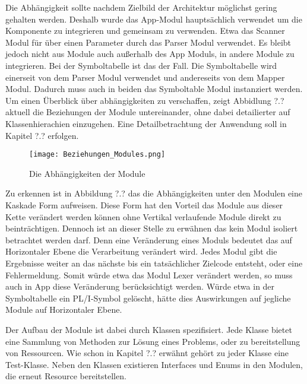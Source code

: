 Die Abhängigkeit sollte nachdem Zielbild der Architektur möglichst gering gehalten werden.
Deshalb wurde das App-Modul hauptsächlich verwendet um die Komponente zu integrieren und gemeinsam zu verwenden.
Etwa das Scanner Modul für über einen Parameter durch das Parser Modul verwendet.
Es bleibt jedoch nicht aus Module auch außerhalb des App Moduls, in andere Module zu integrieren.
Bei der Symboltabelle ist das der Fall. Die Symboltabelle wird einerseit von dem Parser Modul verwendet und andereseits von dem Mapper Modul.
Dadurch muss auch in beiden das Symboltable Modul instanziert werden. Um einen Überblick über abhängigkeiten zu verschaffen, zeigt
Abbidlung ?.? aktuell die Beziehungen der Module untereinander, ohne dabei detailierter auf Klassenhierachien einzugehen. 
Eine Detailbetrachtung der Anwendung soll in Kapitel ?.? erfolgen.

\begin{figure}[h]
	\centering
	\caption{Die Abhängigkeiten der Module}
	\texttt{[image: Beziehungen\_Modules.png]}
	\label{fig:modules}
\end{figure}

Zu erkennen ist in Abbildung ?.? das die Abhängigkeiten unter den Modulen eine Kaskade Form aufweisen.
Diese Form hat den Vorteil das Module aus dieser Kette verändert werden können ohne Vertikal verlaufende Module direkt zu beinträchtigen.
Dennoch ist an dieser Stelle zu erwähnen das kein Modul isoliert betrachtet werden darf. Denn eine Veränderung eines Moduls bedeutet das auf Horizontaler 
Ebene die Verarbeitung verändert wird.
Jedes Modul gibt die Ergebnisse weiter an das nächste bis ein tatsächlicher Zielcode entsteht, oder eine Fehlermeldung.
Somit würde etwa das Modul Lexer verändert werden, so muss auch in App diese Veränderung berücksichtigt werden.
Würde etwa in der Symboltabelle ein PL/I-Symbol gelöscht, hätte dies Auswirkungen auf jegliche Module auf Horizontaler Ebene. 

Der Aufbau der Module ist dabei durch Klassen spezifisiert. Jede Klasse bietet eine Sammlung von Methoden zur Lösung eines Problems,
oder zu bereitstellung von Ressourcen. 
Wie schon in Kapitel ?.? erwähnt gehört zu jeder Klasse eine Test-Klasse. Neben den Klassen existieren Interfaces und Enums in den Modulen,
die erneut Resource bereitstellen.

